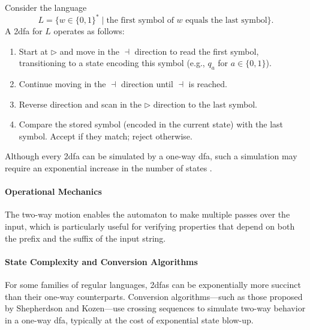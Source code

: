 \begin{example}
    Consider the language 
    \[
    L = \{ w\in \{0,1\}^* \mid \text{the first symbol of } w \text{ equals the last symbol} \}.
    \]
    A \gls{2dfa} for \(L\) operates as follows:
    \begin{enumerate}
      \item Start at \(\triangleright\) and move in the \(\dashv\) direction to read the first symbol, transitioning to a state encoding this symbol (e.g., \(q_a\) for \(a \in \{0,1\}\)).
      \item Continue moving in the \(\dashv\) direction until \(\dashv\) is reached.
      \item Reverse direction and scan in the \(\triangleright\) direction to the last symbol.
      \item Compare the stored symbol (encoded in the current state) with the last symbol. Accept if they match; reject otherwise.
    \end{enumerate}
\end{example}

\begin{observation}
    Although every \gls{2dfa} can be simulated by a one-way \gls{dfa}, such a simulation may require an exponential increase in the number of states \cite{shepherdson1959reduction}.
\end{observation}

\paragraph{Operational Mechanics}
The two-way motion enables the automaton to make multiple passes over the input, which is particularly useful for verifying properties that depend on both the prefix and the suffix of the input string.

\paragraph{State Complexity and Conversion Algorithms}
For some families of regular languages, \glspl{2dfa} can be exponentially more succinct than their one-way counterparts. Conversion algorithms—such as those proposed by Shepherdson and Kozen—use crossing sequences to simulate two-way behavior in a one-way \gls{dfa}, typically at the cost of exponential state blow-up.

